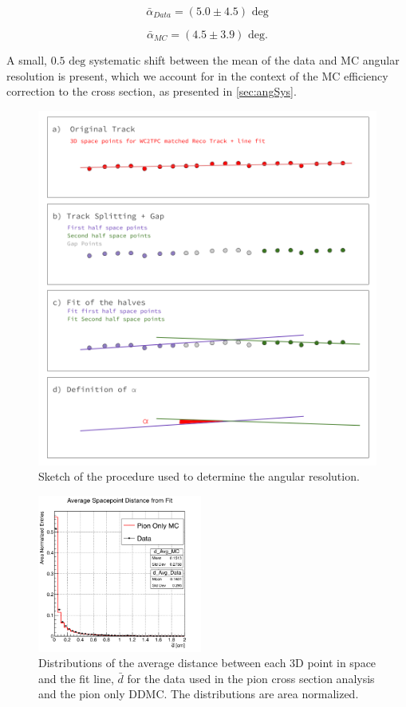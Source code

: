 \begin{equation}
\bar\alpha_{Data} = (5.0 \pm 4.5) \text{ deg} 
\end{equation}

\begin{equation}
\bar\alpha_{MC} = (4.5 \pm 3.9) \text{ deg}. 
\end{equation}

A small, $0.5 \text{ deg}$ systematic shift between the mean of the data and MC angular resolution is present, which we account for in the context of the MC efficiency correction to the cross section, as presented in \ref{sec:angSys}.


\begin{figure}[htb]
\centering
\includegraphics[width=\textwidth]{Studies/Figures/TrackingProcedure.png}
\caption[]{ Sketch of the procedure used to determine the angular resolution. } \label{fig:AngResProcedure}
\end{figure}


\begin{figure}[htb]
\centering
\includegraphics[width=0.48\textwidth]{Studies/Figures/cDAvg.png}
\caption[]{Distributions of the average distance between each 3D point in space and the fit line,  $\bar d$ for the data used in the pion cross section analysis and the pion only DDMC. The distributions are area normalized. } \label{fig:Chi2AllPts}
\end{figure}

